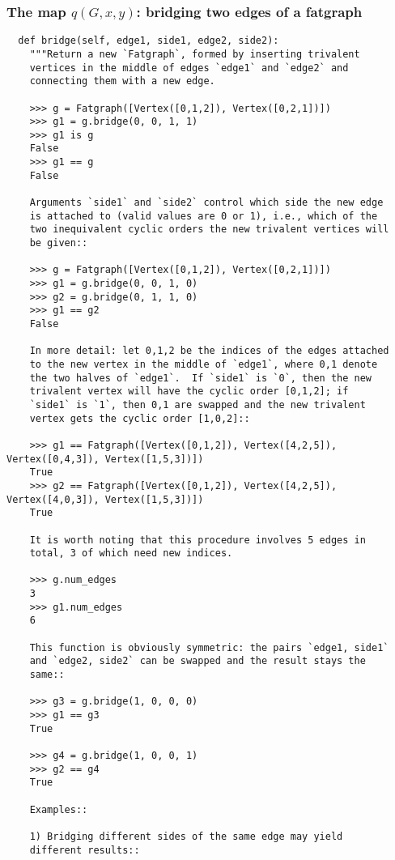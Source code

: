 \subsubsection{The map $q(G,x,y)$: bridging two edges of a fatgraph}
\label{sec:bridge}

\begin{lstlisting}
  def bridge(self, edge1, side1, edge2, side2):
    """Return a new `Fatgraph`, formed by inserting trivalent
    vertices in the middle of edges `edge1` and `edge2` and
    connecting them with a new edge.

    >>> g = Fatgraph([Vertex([0,1,2]), Vertex([0,2,1])])
    >>> g1 = g.bridge(0, 0, 1, 1)
    >>> g1 is g
    False
    >>> g1 == g
    False
    
    Arguments `side1` and `side2` control which side the new edge
    is attached to (valid values are 0 or 1), i.e., which of the
    two inequivalent cyclic orders the new trivalent vertices will
    be given::
    
    >>> g = Fatgraph([Vertex([0,1,2]), Vertex([0,2,1])])
    >>> g1 = g.bridge(0, 0, 1, 0)
    >>> g2 = g.bridge(0, 1, 1, 0)
    >>> g1 == g2
    False

    In more detail: let 0,1,2 be the indices of the edges attached
    to the new vertex in the middle of `edge1`, where 0,1 denote
    the two halves of `edge1`.  If `side1` is `0`, then the new
    trivalent vertex will have the cyclic order [0,1,2]; if
    `side1` is `1`, then 0,1 are swapped and the new trivalent
    vertex gets the cyclic order [1,0,2]::

    >>> g1 == Fatgraph([Vertex([0,1,2]), Vertex([4,2,5]), Vertex([0,4,3]), Vertex([1,5,3])])
    True
    >>> g2 == Fatgraph([Vertex([0,1,2]), Vertex([4,2,5]), Vertex([4,0,3]), Vertex([1,5,3])])
    True

    It is worth noting that this procedure involves 5 edges in
    total, 3 of which need new indices.

    >>> g.num_edges
    3
    >>> g1.num_edges
    6
    
    This function is obviously symmetric: the pairs `edge1, side1`
    and `edge2, side2` can be swapped and the result stays the
    same::

    >>> g3 = g.bridge(1, 0, 0, 0)
    >>> g1 == g3
    True

    >>> g4 = g.bridge(1, 0, 0, 1)
    >>> g2 == g4
    True

    Examples::
    
    1) Bridging different sides of the same edge may yield
    different results::
    

\end{lstlisting}

